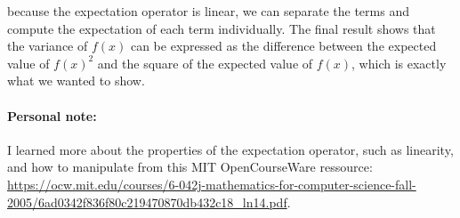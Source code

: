 \documentclass{article}
\begin{document}
\begin{tcolorbox}[breakable,colback=gray!5,colframe=gray!60,title=Solution]
because the expectation operator is linear, we can separate the terms and compute the expectation 
of each term individually. The final result shows that the variance of $f(x)$ can be expressed as 
the difference between the expected value of $f(x)^2$ and the square of the expected value of 
$f(x)$, which is exactly what we wanted to show.

\par\medskip
\paragraph{Personal note:} I learned more about the properties of the expectation operator, 
such as linearity, and how to manipulate from this MIT OpenCourseWare ressource: 
\url{https://ocw.mit.edu/courses/6-042j-mathematics-for-computer-science-fall-2005/6ad0342f836f80c219470870db432c18_ln14.pdf}.

\end{tcolorbox}
\end{document}
